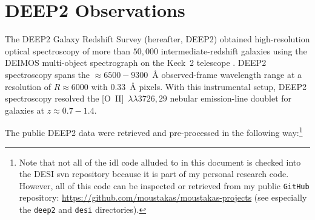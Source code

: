 \documentclass[12pt]{article}
\newcommand{\oiilam}{[O~II]~\ensuremath{\lambda\lambda3726,29}}
\begin{document}
\section{DEEP2 Observations}

The DEEP2 Galaxy Redshift Survey (hereafter, DEEP2) obtained
high-resolution optical spectroscopy of more than $50,000$
intermediate-redshift galaxies using the DEIMOS multi-object
spectrograph on the Keck~2 telescope \citep{newman13a}.  DEEP2
spectroscopy spans the $\approx6500-9300$~\AA{} observed-frame
wavelength range at a resolution of $R\approx6000$ with $0.33$~\AA{}
pixels.  With this instrumental setup, DEEP2 spectroscopy resolved the
\oiilam{} nebular emission-line doublet for galaxies at
$z\approx0.7-1.4$.

The public DEEP2 data were retrieved and pre-processed in the
following way:\footnote{Note that not all of the {\sc idl} code
  alluded to in this document is checked into the DESI {\sc svn}
  repository because it is part of my personal research code.
  However, all of this code can be inspected or retrieved from my
  public {\tt GitHub} repository:
  \url{https://github.com/moustakas/moustakas-projects} (see
  especially the {\tt deep2} and {\tt desi} directories).}

\end{document}
